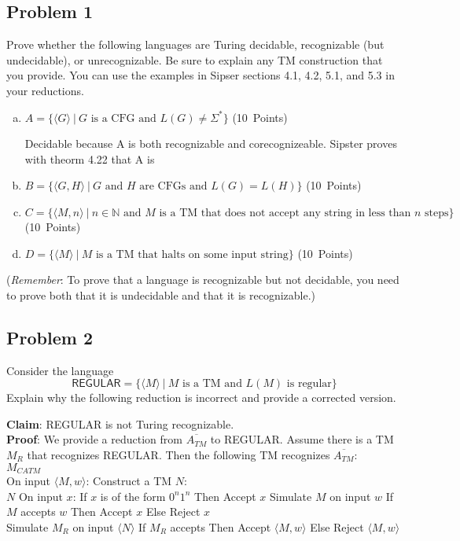\documentclass{article}
\begin{document}
\subsection*{Problem 1}

    Prove whether the following languages are Turing decidable, recognizable (but undecidable), or unrecognizable. Be sure to explain any TM construction that you provide. You can use the examples in Sipser sections 4.1, 4.2, 5.1, and 5.3 in your reductions.
    
\begin{enumerate}[(a)]
\item $A = \{ \langle G \rangle ~|~ \text{$G$ is a CFG and } L(G) \neq \Sigma^* \}$ (10~Points)

    Decidable because A is both recognizable and corecognizeable. Sipster proves with theorm 4.22 that A is 

\item $B = \{ \langle G, H \rangle ~|~ \text{$G$ and $H$ are CFGs and } L(G) = L(H) \}$ (10~Points)


\item $C = \{ \langle M,n \rangle ~|~ n \in \mathbb{N} \text{ and $M$ is a TM that does not accept any string in less than $n$ steps} \}$ (10~Points)


\item $D = \{ \langle M \rangle ~|~  \text{$M$ is a TM that halts on some input string} \}$ (10~Points)
\end{enumerate}
(\emph{Remember}: To prove that a language is recognizable but not decidable, you need to prove both that it is undecidable and that it is recognizable.)

\newpage
\subsection*{Problem 2}

Consider the language
\[\mathsf{REGULAR} = \{ \langle M \rangle ~|~ \text{$M$ is a TM and $L(M)$ is regular} \} \]  
Explain why the following reduction is incorrect and provide a corrected version.


\textbf{Claim}: \textsf{REGULAR} is not Turing recognizable.\\
\textbf{Proof}: We provide a reduction from $\overline{A_{TM}}$ to \textsf{REGULAR}. Assume there is a TM $M_R$ that recognizes \textsf{REGULAR}. Then the following TM recognizes  $\overline{A_{TM}}$:\\[10pt]
    $M_{CATM}$\\
        On input $\langle M,w \rangle$:
        Construct a TM $N$: \\
        $N$
        On input $x$:
        If $x$ is of the form $0^n1^n$ Then Accept $x$
        Simulate $M$ on input $w$
        If $M$ accepts $w$ Then Accept $x$
        Else Reject $x$  \\
        Simulate $M_R$ on input $\langle N \rangle$
        If $M_R$ accepts Then Accept $\langle M,w \rangle$
        Else Reject $\langle M,w \rangle$
\end{document}
